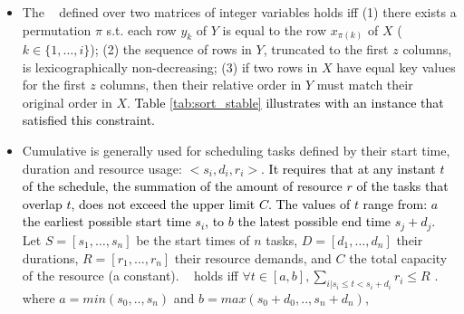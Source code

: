 \begin{itemize}
    \item The ~\cite{beldiceanu2002sweep,DBLP:conf/gcai/BeldiceanuCFLPP15} defined over two matrices of integer variables holds iff (1) there exists a permutation $\pi$ s.t. each row $y_k$ of $Y$ is equal to the row $x_{\pi(k)}$ of $X$ ($k \in \{1,…,i\}$); (2) the sequence of rows in $Y$, truncated to the first $z$ columns, is lexicographically non-decreasing; 
    (3) if two rows in $X$ have equal key values for the first $z$ columns, then their relative order in $Y$ must match their original order in $X$.
    \textcolor{black}{Table \ref{tab:sort_stable} illustrates with an instance that satisfied this constraint.}
    
    \item 
    Cumulative is generally used for scheduling tasks defined by their start time, duration and resource usage: $<s_i,d_i,r_i>$.
    \textcolor{black}{
    It requires that at any instant $t$ of the schedule, the summation of the amount of resource $r$ of the tasks that overlap $t$, does not exceed the upper limit $C$. The values of $t$ range from: $a$ the earliest possible start time $s_i$, to $b$ the latest possible end time $s_j+d_j$.
    }
    Let $S=[s_1,…,s_n]$ be the start times of $n$ tasks, $D=[d_1,…,d_n]$ their durations, $R=[r_1,…,r_n]$ their resource demands, and $C$ the total capacity of the resource (a constant). %
    ~\cite{beldiceanu1994chip,DBLP:journals/informs/MercierH08} holds iff $\forall t \in [a,b], \sum_{ i | s_i\leq t < s_{i}+d_i} r_i \leq R$ \cite{cumulative}.
    where $a = min(s_0,..,s_n)$ and $b = max(s_0+d_0,..,s_n+d_n)$,
\end{itemize}

